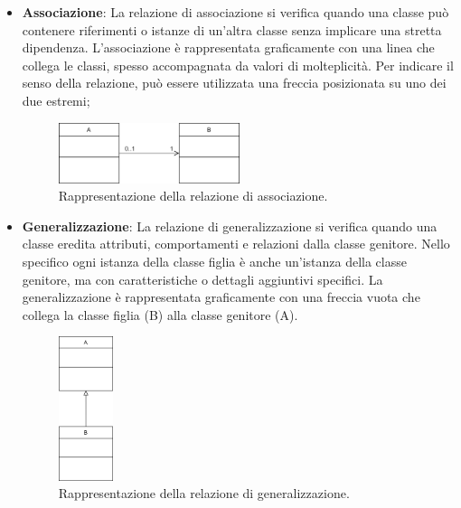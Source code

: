 \documentclass[10pt]{article}
\begin{document}
\begin{justify}
\begin{itemize}
            \item \textbf{Associazione}: La relazione di associazione si verifica quando una classe può contenere riferimenti o istanze di un'altra classe senza implicare una stretta dipendenza. L'associazione è rappresentata graficamente con una linea che collega le classi, spesso accompagnata da valori di molteplicità. Per indicare il senso della relazione, può essere utilizzata una freccia posizionata su uno dei due estremi;
            \begin{figure}[H]
            \centering
            \includegraphics[width=0.5\textwidth]{AssociazioneClasse.png}
            \caption{Rappresentazione della relazione di associazione.}
            \end{figure}

            \item \textbf{Generalizzazione}: La relazione di generalizzazione si verifica quando una classe eredita attributi, comportamenti e relazioni dalla classe genitore. Nello specifico ogni istanza della classe figlia è anche un'istanza della classe genitore, ma con caratteristiche o dettagli aggiuntivi specifici. La generalizzazione è rappresentata graficamente con una freccia vuota che collega la classe figlia (B) alla classe genitore (A).
            \begin{figure}[H]
            \centering
            \includegraphics[width=0.15\textwidth]
            {GeneralizzazioneClasse.png}
            \caption{Rappresentazione della relazione di generalizzazione.}
            \end{figure}
        \end{itemize}


\end{justify}
\end{document}
